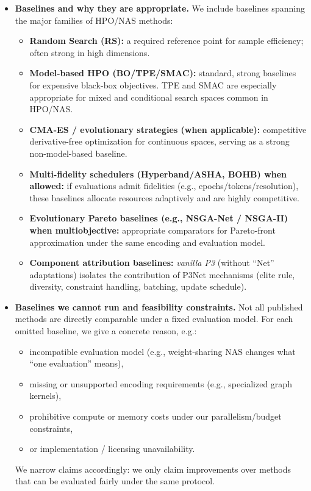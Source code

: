 \begin{itemize}
    \item \textbf{Baselines and why they are appropriate.}
    We include baselines spanning the major families of HPO/NAS methods:
    \begin{itemize}
        \item \textbf{Random Search (RS):} a required reference point for sample efficiency; often strong in high dimensions.
        \item \textbf{Model-based HPO (BO/TPE/SMAC):} standard, strong baselines for expensive black-box objectives.
        TPE and SMAC are especially appropriate for mixed and conditional search spaces common in HPO/NAS.
        \item \textbf{CMA-ES / evolutionary strategies (when applicable):} competitive derivative-free optimization for continuous spaces,
        serving as a strong non-model-based baseline.
        \item \textbf{Multi-fidelity schedulers (Hyperband/ASHA, BOHB) when allowed:} if evaluations admit fidelities
        (e.g., epochs/tokens/resolution), these baselines allocate resources adaptively and are highly competitive.
        \item \textbf{Evolutionary Pareto baselines (e.g., NSGA-Net / NSGA-II) when multiobjective:} appropriate comparators for Pareto-front approximation
        under the same encoding and evaluation model.
        \item \textbf{Component attribution baselines:} \emph{vanilla P3} (without ``Net'' adaptations) isolates the contribution of P3Net mechanisms
        (elite rule, diversity, constraint handling, batching, update schedule).
    \end{itemize}

    \item \textbf{Baselines we cannot run and feasibility constraints.}
    Not all published methods are directly comparable under a fixed evaluation model.
    For each omitted baseline, we give a concrete reason, e.g.:
    \begin{itemize}
        \item incompatible evaluation model (e.g., weight-sharing NAS changes what ``one evaluation'' means),
        \item missing or unsupported encoding requirements (e.g., specialized graph kernels),
        \item prohibitive compute or memory costs under our parallelism/budget constraints,
        \item or implementation / licensing unavailability.
    \end{itemize}
    We narrow claims accordingly: we only claim improvements over methods that can be evaluated fairly under the same protocol.


\end{itemize}
